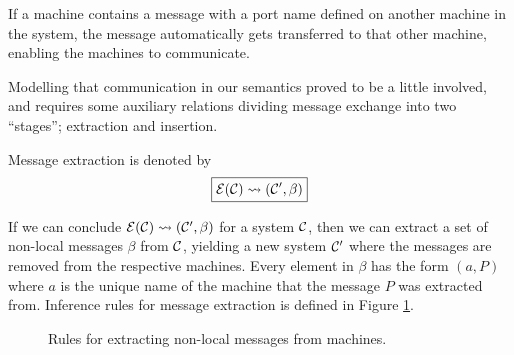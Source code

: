 If a machine contains a message with a port name defined on another machine in
the system, the message automatically gets transferred to that other machine,
enabling the machines to communicate.

Modelling that communication in our semantics proved to be a little involved,
and requires some auxiliary relations dividing message exchange into
two ``stages''; extraction and insertion.

Message extraction is denoted by
\begin{equation*}
\boxed{\mathcal{E}(\mathcal{C}) \leadsto (\mathcal{C}', \beta)}
\end{equation*}

If we can conclude $\mathcal{E}(\mathcal{C}) \leadsto (\mathcal{C}', \beta)$ for a system $\mathcal{C}$, then we
can extract a set of non-local messages $\beta$ from $\mathcal{C}$, yielding a new
system $\mathcal{C}'$ where the messages are removed from the respective machines. Every
element in $\beta$ has the form $(a, P)$ where $a$ is the unique name of the
machine that the message $P$ was extracted from. Inference rules for message
extraction is defined in Figure \ref{fig:rule:extract}.

\begin{figure}[!h]
\caption{Rules for extracting non-local messages from machines.}\label{fig:rule:extract}
\end{figure}

